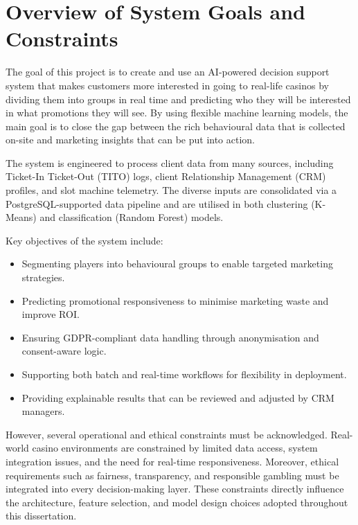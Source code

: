 \documentclass[12pt,a4paper]{report}
\begin{document}
\section{Overview of System Goals and Constraints}

The goal of this project is to create and use an AI-powered decision support system that makes customers more interested in going to real-life casinos by dividing them into groups in real time and predicting who they will be interested in what promotions they will see.  By using flexible machine learning models, the main goal is to close the gap between the rich behavioural data that is collected on-site and marketing insights that can be put into action.

The system is engineered to process client data from many sources, including Ticket-In Ticket-Out (TITO) logs, client Relationship Management (CRM) profiles, and slot machine telemetry.  The diverse inputs are consolidated via a PostgreSQL-supported data pipeline and are utilised in both clustering (K-Means) and classification (Random Forest) models.

Key objectives of the system include:

\begin{itemize}
  \item Segmenting players into behavioural groups to enable targeted marketing strategies.
  \item Predicting promotional responsiveness to minimise marketing waste and improve ROI.
  \item Ensuring GDPR-compliant data handling through anonymisation and consent-aware logic.
  \item Supporting both batch and real-time workflows for flexibility in deployment.
  \item Providing explainable results that can be reviewed and adjusted by CRM managers.
\end{itemize}

However, several operational and ethical constraints must be acknowledged. Real-world casino environments are constrained by limited data access, system integration issues, and the need for real-time responsiveness. Moreover, ethical requirements such as fairness, transparency, and responsible gambling must be integrated into every decision-making layer. These constraints directly influence the architecture, feature selection, and model design choices adopted throughout this dissertation.
\end{document}
